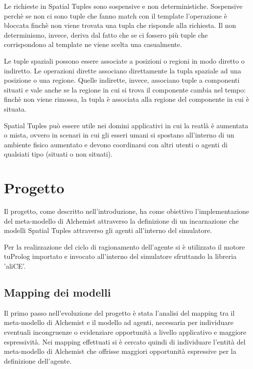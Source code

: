 \documentclass[12pt,a4paper,openright,twoside]{report}
\begin{document}
Le richieste in Spatial Tuples sono sospensive e non deterministiche. Sospensive perch\`e se non ci sono tuple che fanno match con il template l'operazione \`e bloccata finch\`e non viene trovata una tupla che risponde alla richiesta. Il non determinismo, invece, deriva dal fatto che se ci fossero pi\`u tuple che corrispondono al template ne viene scelta una casualmente.

Le tuple spaziali possono essere associate a posizioni o regioni in modo diretto o indiretto. Le operazioni dirette associano direttamente la tupla spaziale ad una posizione o una regione. Quelle indirette, invece, associano tuple a componenti situati e vale anche se la regione in cui si trova il componente cambia nel tempo: finch\`e non viene rimossa, la tupla \`e associata alla regione del componente in cui \`e situata.

Spatial Tuples pu\`o essere utile nei domini applicativi in cui la reatl\`a \`e aumentata o mista, ovvero in scenari in cui gli esseri umani si spostano all'interno di un ambiente fisico aumentato e devono coordinarsi con altri utenti o agenti di qualsiati tipo (situati o non situati).

\chapter{Progetto}
\lhead[\fancyplain{}{\bfseries\thepage}]{\fancyplain{}{\bfseries\rightmark}}

Il progetto, come descritto nell'introduzione, ha come obiettivo l'implementazione del meta-modello di Alchemist attraverso la definizione di un incarnazione che modelli Spatial Tuples attraverso gli agenti all'interno del simulatore.

Per la realizzazione del ciclo di ragionamento dell'agente si \`e utilizzato il motore tuProlog importato e invocato all'interno del simulatore sfruttando la libreria 'aliCE'.

\section{Mapping dei modelli}
Il primo passo nell'evoluzione del progetto \`e stata l'analisi del mapping tra il meta-modello di Alchemist e il modello ad agenti, necessaria per individuare eventuali incongruenze o evidenziare opportunit\`a a livello applicativo e maggiore espressivit\`a.
Nei mapping effettuati si \`e cercato quindi di individuare l'entit\`a del meta-modello di Alchemist che offrisse maggiori opportunit\`a espressive per la definizione dell'agente.
\end{document}
